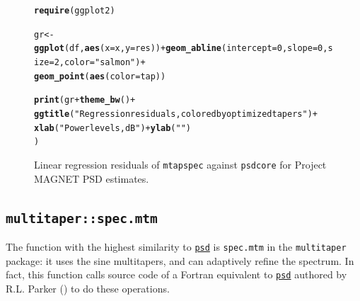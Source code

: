 \documentclass[10pt]{article}\usepackage[]{graphicx}\usepackage[]{color}
\makeatletter
\newcommand{\hlnum}[1]{\textcolor[rgb]{0.686,0.059,0.569}{#1}}%
\newcommand{\hlstr}[1]{\textcolor[rgb]{0.192,0.494,0.8}{#1}}%
\newcommand{\hlopt}[1]{\textcolor[rgb]{0,0,0}{#1}}%
\newcommand{\hlstd}[1]{\textcolor[rgb]{0.345,0.345,0.345}{#1}}%
\newcommand{\hlkwb}[1]{\textcolor[rgb]{0.69,0.353,0.396}{#1}}%
\newcommand{\hlkwc}[1]{\textcolor[rgb]{0.333,0.667,0.333}{#1}}%
\newcommand{\hlkwd}[1]{\textcolor[rgb]{0.737,0.353,0.396}{\textbf{#1}}}%
\newenvironment{kframe}{%
 \def\at@end@of@kframe{}%
 \ifinner\ifhmode%
  \def\at@end@of@kframe{\end{minipage}}%
  \begin{minipage}{\columnwidth}%
 \fi\fi%
 \def\FrameCommand##1{\hskip\@totalleftmargin \hskip-\fboxsep
 \colorbox{shadecolor}{##1}\hskip-\fboxsep
     \hskip-\linewidth \hskip-\@totalleftmargin \hskip\columnwidth}%
 \MakeFramed {\advance\hsize-\width
   \@totalleftmargin\z@ \linewidth\hsize
   \@setminipage}}%
 {\par\unskip\endMakeFramed%
 \at@end@of@kframe}
\newenvironment{knitrout}{}{} %
\newcommand{\Rcmd}[1]{\texttt{#1}}
\newcommand{\psd}[0]{\href{http://abarbour.github.com/psd/}{\color{blue}\Rcmd{psd}}}
\makeatother
\begin{document}
\begin{figure}[h!]
\begin{center}
\begin{knitrout}
\color{fgcolor}\begin{kframe}
\begin{alltt}
\hlkwd{require}\hlstd{(ggplot2)}
\end{alltt}


{\ttfamily\noindent\itshape\color{messagecolor}{\#\# Loading required package: ggplot2}}\begin{alltt}
\hlstd{gr} \hlkwb{<-} \hlkwd{ggplot}\hlstd{(df,} \hlkwd{aes}\hlstd{(}\hlkwc{x}\hlstd{=x,} \hlkwc{y}\hlstd{=res))} \hlopt{+} \hlkwd{geom_abline}\hlstd{(}\hlkwc{intercept}\hlstd{=}\hlnum{0}\hlstd{,} \hlkwc{slope}\hlstd{=}\hlnum{0}\hlstd{,} \hlkwc{size}\hlstd{=}\hlnum{2}\hlstd{,} \hlkwc{color}\hlstd{=}\hlstr{"salmon"}\hlstd{)} \hlopt{+}
\hlkwd{geom_point}\hlstd{(}\hlkwd{aes}\hlstd{(}\hlkwc{color}\hlstd{=tap))}
\end{alltt}


{\ttfamily\noindent\bfseries\color{errorcolor}{\#\# Error: ggplot2 doesn't know how to deal with data of class function}}\begin{alltt}
\hlkwd{print}\hlstd{(gr} \hlopt{+} \hlkwd{theme_bw}\hlstd{()} \hlopt{+}
\hlkwd{ggtitle}\hlstd{(}\hlstr{"Regression residuals, colored by optimized tapers"}\hlstd{)}\hlopt{+}
\hlkwd{xlab}\hlstd{(}\hlstr{"Power levels, dB"}\hlstd{)} \hlopt{+} \hlkwd{ylab}\hlstd{(}\hlstr{""}\hlstd{)}
\hlstd{)}
\end{alltt}


{\ttfamily\noindent\bfseries{}}\end{kframe}
\end{knitrout}
\caption{Linear regression residuals of
\Rcmd{mtapspec} against \Rcmd{psdcore} for Project MAGNET PSD estimates.}
\label{fig:psdreg}
\end{center}
\end{figure}

\subsection{\Rcmd{multitaper::spec.mtm}}
The function with the highest similarity to \psd{} is
\Rcmd{spec.mtm} in the \Rcmd{multitaper} package: it uses
the sine multitapers, and can adaptively refine the spectrum.
In fact, this function
calls source code of a Fortran equivalent to \psd{}
authored by R.L. Parker (\citeyear{parkerweb}) to do these operations.
\end{document}
